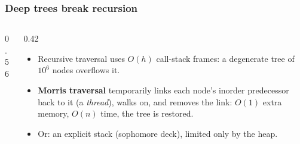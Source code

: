 \documentclass[aspectratio=169,10pt,compress]{beamer}
\begin{document}
\begin{frame}[t,fragile] \frametitle{Deep trees break recursion}
  \begin{columns}[T]
    \begin{column}{0.56\textwidth}
    \end{column}
    \begin{column}{0.42\textwidth}
      \begin{itemize}\small
        \item Recursive traversal uses $O(h)$ call-stack frames: a degenerate tree of $10^{6}$ nodes overflows it.
        \item \textbf{Morris traversal} temporarily links each node's inorder predecessor back to it (a \emph{thread}),
              walks on, and removes the link: $O(1)$ extra memory, $O(n)$ time, the tree is restored.
        \item Or: an explicit stack (sophomore deck), limited only by the heap.
      \end{itemize}
    \end{column}
  \end{columns}
\end{frame}

\end{document}
